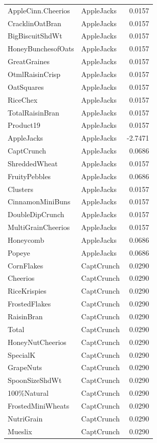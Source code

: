 \begin{longtable}{llr}
AppleCinn.Cheerios & AppleJacks & 0.0157 \\
CracklinOatBran & AppleJacks & 0.0157 \\
BigBiscuitShdWt & AppleJacks & 0.0157 \\
HoneyBunchesofOats & AppleJacks & 0.0157 \\
GreatGraines & AppleJacks & 0.0157 \\
OtmlRaisinCrisp & AppleJacks & 0.0157 \\
OatSquares & AppleJacks & 0.0157 \\
RiceChex & AppleJacks & 0.0157 \\
TotalRaisinBran & AppleJacks & 0.0157 \\
Product19 & AppleJacks & 0.0157 \\
AppleJacks & AppleJacks & -2.7471 \\
CaptCrunch & AppleJacks & 0.0686 \\
ShreddedWheat & AppleJacks & 0.0157 \\
FruityPebbles & AppleJacks & 0.0686 \\
Clusters & AppleJacks & 0.0157 \\
CinnamonMiniBuns & AppleJacks & 0.0157 \\
DoubleDipCrunch & AppleJacks & 0.0157 \\
MultiGrainCheerios & AppleJacks & 0.0157 \\
Honeycomb & AppleJacks & 0.0686 \\
Popeye & AppleJacks & 0.0686 \\
CornFlakes & CaptCrunch & 0.0290 \\
Cheerios & CaptCrunch & 0.0290 \\
RiceKrispies & CaptCrunch & 0.0290 \\
FrostedFlakes & CaptCrunch & 0.0290 \\
RaisinBran & CaptCrunch & 0.0290 \\
Total & CaptCrunch & 0.0290 \\
HoneyNutCheerios & CaptCrunch & 0.0290 \\
SpecialK & CaptCrunch & 0.0290 \\
GrapeNuts & CaptCrunch & 0.0290 \\
SpoonSizeShdWt & CaptCrunch & 0.0290 \\
100\%Natural & CaptCrunch & 0.0290 \\
FrostedMiniWheats & CaptCrunch & 0.0290 \\
NutriGrain & CaptCrunch & 0.0290 \\
Mueslix & CaptCrunch & 0.0290 \\

\end{longtable}
